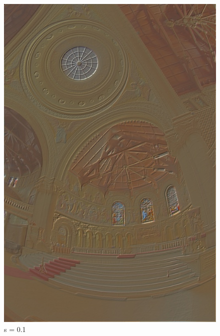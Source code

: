 \documentclass{article}
\begin{document}
    \begin{figure}[!htb]
      \includegraphics[scale=.27]{./data/3/svar/s1.jpg}
      \caption{s = 0.1}
    \endminipage\hfill

\end{figure}
\end{document}

